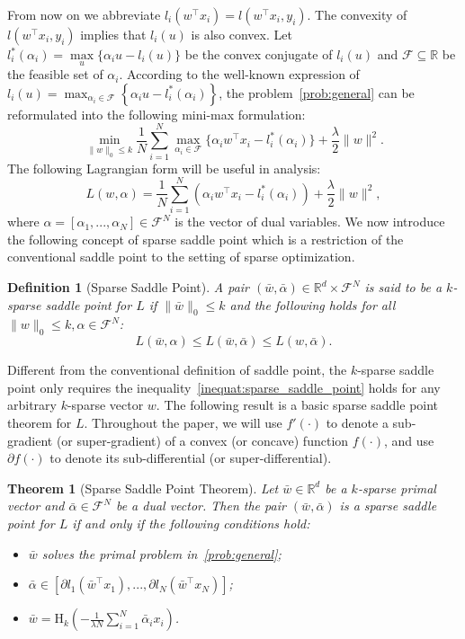 \documentclass[11pt]{article}
\newtheorem{theorem}{Theorem}
\newtheorem{definition}{Definition}
\numberwithin{equation}{section}
\numberwithin{table}{section}
\numberwithin{figure}{section}
\begin{document}
From now on we abbreviate $l_i(w^\top x_i) = l(w^\top x_i,y_i)$. The convexity of $l(w^\top x_i,y_i)$ implies that $l_i(u)$ is also convex. Let $l^*_i(\alpha_i)=\max\limits_{u}\{\alpha_iu - l_i(u)\}$ be the convex conjugate of $l_i(u)$ and $\mathcal{F}\subseteq \mathbb{R}$ be the feasible set of $\alpha_i$. According to the well-known expression of $l_i(u)=\max_{\alpha_i \in \mathcal{F}} \left\{\alpha_i u - l^*_i(\alpha_i)\right\}$, the problem~\eqref{prob:general} can be reformulated into the following mini-max formulation:
\begin{equation}\label{eqn:primaldual}
\min_{\|w\|_0 \le k} \frac{1}{N}\sum\limits_{i=1}^N\max_{\alpha_i \in \mathcal{F}}\{\alpha_i w^\top x_i - l^*_i(\alpha_i)\} + \frac{\lambda}{2}\|w\|^2.
\end{equation}
The following Lagrangian form will be useful in analysis:
\[
L(w,\alpha) = \frac{1}{N}\sum\limits_{i=1}^N\left(\alpha_iw^\top x_i - l^*_i(\alpha_i)\right) + \frac{\lambda}{2}\|w\|^2,
\]
where $\alpha=[\alpha_1,...,\alpha_N] \in \mathcal{F}^N$ is the vector of dual variables. We now introduce the following concept of sparse saddle point which is a restriction of the conventional saddle point to the setting of sparse optimization.
\begin{definition}[Sparse Saddle Point]
A pair $(\bar w, \bar \alpha)\in \mathbb{R}^d \times \mathcal{F}^N$ is said to be a $k$-sparse saddle point for $L$ if $\|\bar w\|_0 \le k$ and the following holds for all $\|w\|_0 \le k, \alpha \in \mathcal{F}^N$:
\begin{equation}\label{inequat:sparse_saddle_point}
L(\bar w, \alpha) \le L(\bar w, \bar \alpha) \le L(w, \bar \alpha).
\end{equation}
\end{definition}
Different from the conventional definition of saddle point, the $k$-sparse saddle point only requires the inequality~\eqref{inequat:sparse_saddle_point} holds for any arbitrary $k$-sparse vector $w$. The following result is a basic sparse saddle point theorem for $L$. Throughout the paper, we will use $f'(\cdot)$ to denote a sub-gradient (or super-gradient) of a convex (or concave) function $f(\cdot)$, and use $\partial f(\cdot)$ to denote its sub-differential (or super-differential).
\begin{theorem}[Sparse Saddle Point Theorem]\label{thrm:sparse_saddle_point}
Let $\bar w \in \mathbb{R}^d$ be a $k$-sparse primal vector and $\bar \alpha \in \mathcal{F}^N$ be a dual vector. Then the pair $(\bar w, \bar \alpha)$ is a sparse saddle point for $L$ if and only if the following conditions hold:
\begin{itemize}
  \item[(a)] $\bar w$ solves the primal problem in~\eqref{prob:general};
  \item[(b)] $\bar \alpha \in [\partial l_1(\bar w^\top x_1),...,\partial l_N(\bar w^\top x_N)]$;
  \item[(c)] $\bar w = \mathrm{H}_k\left(-\frac{1}{\lambda N}\sum_{i=1}^N \bar\alpha_i x_i\right)$.
\end{itemize}
\end{theorem}
\end{document}
